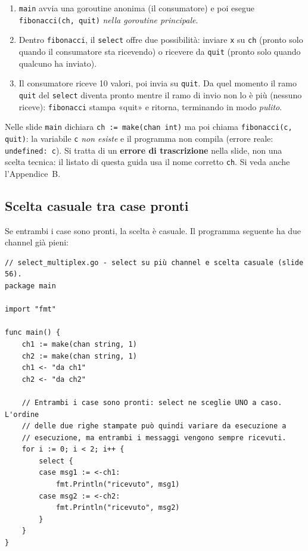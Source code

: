 \documentclass[11pt,a4paper]{report}
\newcommand{\cod}[1]{\texttt{#1}}
\begin{document}
\begin{enumerate}
  \item \cod{main} avvia una goroutine anonima (il consumatore) e poi esegue
        \cod{fibonacci(ch, quit)} \emph{nella goroutine principale}.
  \item Dentro \cod{fibonacci}, il \cod{select} offre due possibilità: inviare
        \cod{x} su \cod{ch} (pronto solo quando il consumatore sta ricevendo) o
        ricevere da \cod{quit} (pronto solo quando qualcuno ha inviato).
  \item Il consumatore riceve 10 valori, poi invia su \cod{quit}. Da quel
        momento il ramo \cod{quit} del \cod{select} diventa pronto
        mentre il ramo di invio non lo è più (nessuno riceve): \cod{fibonacci}
        stampa «quit» e ritorna, terminando in modo \emph{pulito}.
\end{enumerate}

\begin{attenzione}
Nelle slide \cod{main} dichiara \cod{ch := make(chan int)} ma poi chiama
\cod{fibonacci(c, quit)}: la variabile \cod{c} \emph{non esiste} e il
programma non compila (errore reale: \texttt{undefined: c}). Si tratta di un
\textbf{errore di trascrizione} nella slide, non una scelta tecnica: il
listato di questa guida usa il nome corretto \cod{ch}. Si veda anche
l'Appendice~B.
\end{attenzione}

\subsection{Scelta casuale tra case pronti}

Se entrambi i case sono pronti, la scelta è casuale. Il programma seguente ha
due channel già pieni:

\begin{lstlisting}[style=gocode,caption={\texttt{06\_concurrency/select\_multiplex.go}}]
// select_multiplex.go - select su più channel e scelta casuale (slide 56).
package main

import "fmt"

func main() {
	ch1 := make(chan string, 1)
	ch2 := make(chan string, 1)
	ch1 <- "da ch1"
	ch2 <- "da ch2"

	// Entrambi i case sono pronti: select ne sceglie UNO a caso. L'ordine
	// delle due righe stampate può quindi variare da esecuzione a
	// esecuzione, ma entrambi i messaggi vengono sempre ricevuti.
	for i := 0; i < 2; i++ {
		select {
		case msg1 := <-ch1:
			fmt.Println("ricevuto", msg1)
		case msg2 := <-ch2:
			fmt.Println("ricevuto", msg2)
		}
	}
}
\end{lstlisting}
\end{document}
